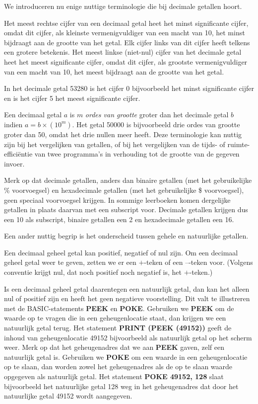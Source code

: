 We introduceren nu enige nuttige terminologie die bij decimale getallen hoort.

Het meest rechtse cijfer van een decimaal getal heet het minst significante cijfer, omdat dit cijfer, als kleinste vermenigvuldiger van een macht van 10, het minst bijdraagt aan de grootte van het getal. Elk cijfer links van dit cijfer heeft telkens een grotere betekenis. Het meest linkse (niet-nul) cijfer van het decimale getal heet het meest significante cijfer, omdat dit cijfer, als grootste vermenigvuldiger van een macht van 10, het meest bijdraagt aan de grootte van het getal.

In het decimale getal 53280 is het cijfer 0 bijvoorbeeld het minst significante cijfer en is het cijfer 5 het meest significante cijfer.

Een decimaal getal $a$ is $m$ {\it ordes van grootte} groter dan het decimale getal $b$ indien $a = b \times (10^{m})$. Het getal 50000 is bijvoorbeeld drie ordes van grootte groter dan 50, omdat het drie nullen meer heeft. Deze terminologie kan nuttig zijn bij het vergelijken van getallen, of bij het vergelijken van de tijds- of ruimte-efficiëntie van twee programma's in verhouding tot de grootte van de gegeven invoer.

Merk op dat decimale getallen, anders dan binaire getallen (met het gebruikelijke \% voorvoegsel) en hexadecimale getallen (met het gebruikelijke \$ voorvoegsel), geen speciaal voorvoegsel krijgen. In sommige leerboeken komen dergelijke getallen in plaats daarvan met een subscript voor. Decimale getallen krijgen dus een 10 als subscript, binaire getallen een 2 en hexadecimale getallen een 16.

Een ander nuttig begrip is het onderscheid tussen gehele en natuurlijke getallen.

Een decimaal geheel getal kan positief, negatief of nul zijn. Om een decimaal geheel getal weer te geven, zetten we er een $+$-teken of een $–$-teken voor. (Volgens conventie krijgt nul, dat noch positief noch negatief is, het $+$-teken.)

Is een decimaal geheel getal daarentegen een natuurlijk getal, dan kan het alleen nul of positief zijn en heeft het geen negatieve voorstelling. Dit valt te illustreren met de BASIC-statements {\bf PEEK} en {\bf POKE}. Gebruiken we {\bf PEEK} om de waarde op te vragen die in een geheugenlocatie staat, dan krijgen we een natuurlijk getal terug. Het statement {\bf PRINT (PEEK (49152))} geeft de inhoud van geheugenlocatie 49152 bijvoorbeeld als natuurlijk getal op het scherm weer. Merk op dat het geheugenadres dat we aan {\bf PEEK} gaven, zelf een natuurlijk getal is. Gebruiken we {\bf POKE} om een waarde in een geheugenlocatie op te slaan, dan worden zowel het geheugenadres als de op te slaan waarde opgegeven als natuurlijk getal. Het statement {\bf POKE 49152, 128} slaat bijvoorbeeld het natuurlijke getal 128 weg in het geheugenadres dat door het natuurlijke getal 49152 wordt aangegeven.

